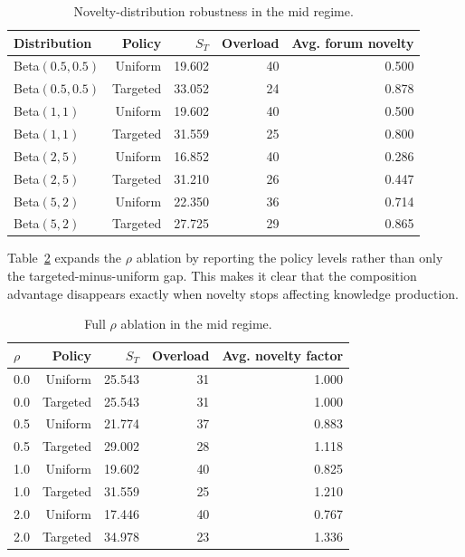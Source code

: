 \documentclass{article}
\begin{document}
\begin{table}[H]
\centering
\caption{Novelty-distribution robustness in the mid regime.}
\label{tab:appendix-novelty-full}
\begin{tabular}{lrrrr}
\toprule
Distribution & Policy & $S_T$ & Overload & Avg. forum novelty \\
\midrule
Beta$(0.5,0.5)$ & Uniform & 19.602 & 40 & 0.500 \\
Beta$(0.5,0.5)$ & Targeted & 33.052 & 24 & 0.878 \\
Beta$(1,1)$ & Uniform & 19.602 & 40 & 0.500 \\
Beta$(1,1)$ & Targeted & 31.559 & 25 & 0.800 \\
Beta$(2,5)$ & Uniform & 16.852 & 40 & 0.286 \\
Beta$(2,5)$ & Targeted & 31.210 & 26 & 0.447 \\
Beta$(5,2)$ & Uniform & 22.350 & 36 & 0.714 \\
Beta$(5,2)$ & Targeted & 27.725 & 29 & 0.865 \\
\bottomrule
\end{tabular}
\end{table}

Table~\ref{tab:appendix-rho-full} expands the $\rho$ ablation by reporting the policy levels rather than only the targeted-minus-uniform gap. This makes it clear that the composition advantage disappears exactly when novelty stops affecting knowledge production.

\begin{table}[H]
\centering
\caption{Full $\rho$ ablation in the mid regime.}
\label{tab:appendix-rho-full}
\begin{tabular}{lrrrr}
\toprule
$\rho$ & Policy & $S_T$ & Overload & Avg. novelty factor \\
\midrule
0.0 & Uniform & 25.543 & 31 & 1.000 \\
0.0 & Targeted & 25.543 & 31 & 1.000 \\
0.5 & Uniform & 21.774 & 37 & 0.883 \\
0.5 & Targeted & 29.002 & 28 & 1.118 \\
1.0 & Uniform & 19.602 & 40 & 0.825 \\
1.0 & Targeted & 31.559 & 25 & 1.210 \\
2.0 & Uniform & 17.446 & 40 & 0.767 \\
2.0 & Targeted & 34.978 & 23 & 1.336 \\
\bottomrule
\end{tabular}
\end{table}
\end{document}
